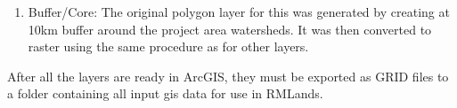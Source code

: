 \begin{enumerate}
    \item Buffer/Core: The original polygon layer for this was generated by creating at 10km buffer around the project area watersheds. It was then converted to raster using the same procedure as for other layers.
    \end{enumerate}
After all the layers are ready in ArcGIS, they must be exported as GRID files to a folder containing all input gis data for use in RMLands.

